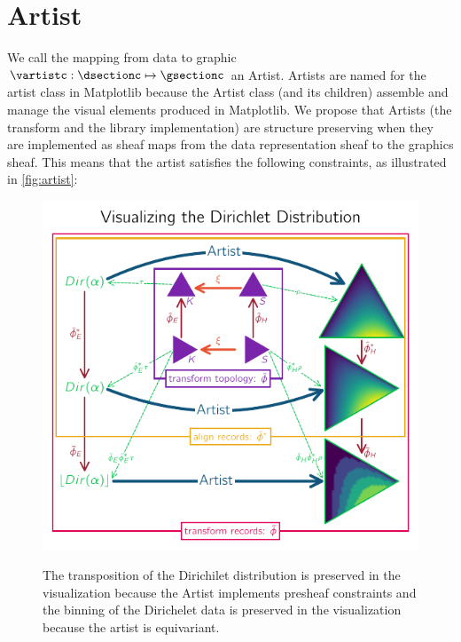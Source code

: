 \documentclass[preprint]{vgtc}
\begin{document}
\section{Artist}
\label{sec:Artist}

We call the mapping from data to graphic $\vartistc:\dsectionc\mapsto\gsectionc$ an \textcolor{artist}{Artist}. Artists are named for the artist class in Matplotlib because the Artist class (and its children) assemble and manage the visual
elements produced in Matplotlib\cite{hunterArchitectureOpenSource}. We propose that Artists (the transform and the library implementation) are structure preserving when they are implemented as sheaf maps from the data representation sheaf to the graphics sheaf. This means that the artist satisfies the following constraints, as illustrated in \autoref{fig:artist}:

\begin{figure}[!h]
    \includegraphics[width=.5\textwidth, alt={Diagram of a dirichelet distribution evaluated on a triangle, transposed, and binned and the corresponding visualization output by the artist function.}]{artist_equiv.pdf}
    \caption{The transposition of the Dirichilet distribution is preserved in the visualization because the Artist implements presheaf constraints and the binning of the Dirichelet data is preserved in the visualization because the artist is equivariant.}\label{fig:artist}
\end{figure}
\end{document}
